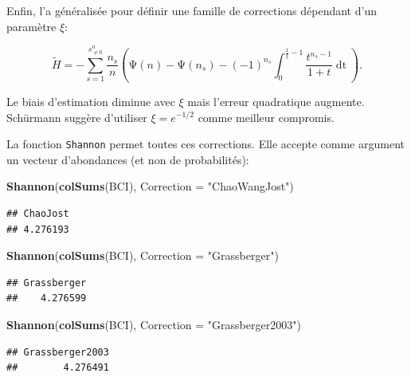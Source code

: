 \documentclass[
  11pt,
  french,
  a4paper,
  extrafontsizes,onecolumn,openright
  ]{memoir}
\newenvironment{Shaded}{\begin{snugshade}}{\end{snugshade}}
\newcommand{\DataTypeTok}[1]{\textcolor[rgb]{0.13,0.29,0.53}{#1}}
\newcommand{\KeywordTok}[1]{\textcolor[rgb]{0.13,0.29,0.53}{\textbf{#1}}}
\newcommand{\NormalTok}[1]{#1}
\newcommand{\StringTok}[1]{\textcolor[rgb]{0.31,0.60,0.02}{#1}}
\begin{document}
Enfin, \textcite{Schurmann2004} l'a généralisée pour définir une famille de corrections dépendant d'un paramètre \(\xi\):

\begin{equation}
  \label{eq:Schurmann2004}
  \tilde{H} = -\sum^{s^{n}_{\ne 0}}_{s=1}
    {\frac{n_s}{n} \left(\mathrm{\Psi}\left(n\right)-\mathrm{\Psi}\left(n_s\right)-{\left(-1\right)}^{n_s}\int^{\frac{1}{\xi}-1}_0{\frac{t^{n_s-1}}{1+t}\mathop{dt}}\right)}.
\end{equation}

Le biais d'estimation diminue avec \(\xi\) mais l'erreur quadratique augmente.
Schürmann suggère d'utiliser \(\xi=e^{-{1}/{2}}\) comme meilleur compromis.

La fonction \texttt{Shannon} permet toutes ces corrections.
Elle accepte comme argument un vecteur d'abondances (et non de probabilités):

\scriptsize

\begin{Shaded}
\begin{Highlighting}[]
\KeywordTok{Shannon}\NormalTok{(}\KeywordTok{colSums}\NormalTok{(BCI), }\DataTypeTok{Correction =} \StringTok{"ChaoWangJost"}\NormalTok{)}
\end{Highlighting}
\end{Shaded}

\begin{verbatim}
## ChaoJost 
## 4.276193
\end{verbatim}

\begin{Shaded}
\begin{Highlighting}[]
\KeywordTok{Shannon}\NormalTok{(}\KeywordTok{colSums}\NormalTok{(BCI), }\DataTypeTok{Correction =} \StringTok{"Grassberger"}\NormalTok{)}
\end{Highlighting}
\end{Shaded}

\begin{verbatim}
## Grassberger 
##    4.276599
\end{verbatim}

\begin{Shaded}
\begin{Highlighting}[]
\KeywordTok{Shannon}\NormalTok{(}\KeywordTok{colSums}\NormalTok{(BCI), }\DataTypeTok{Correction =} \StringTok{"Grassberger2003"}\NormalTok{)}
\end{Highlighting}
\end{Shaded}

\begin{verbatim}
## Grassberger2003 
##        4.276491
\end{verbatim}
\end{document}
